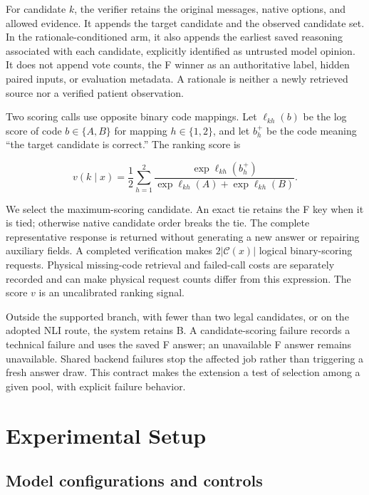 \documentclass[
  english,
  11pt,
]{article}
\begin{document}
For candidate \(k\), the verifier retains the original messages, native
options, and allowed evidence. It appends the target candidate and the
observed candidate set. In the rationale-conditioned arm, it also
appends the earliest saved reasoning associated with each candidate,
explicitly identified as untrusted model opinion. It does not append
vote counts, the F winner as an authoritative label, hidden paired
inputs, or evaluation metadata. A rationale is neither a newly retrieved
source nor a verified patient observation.

Two scoring calls use opposite binary code mappings. Let
\(\ell_{kh}(b)\) be the log score of code \(b\in\{A,B\}\) for mapping
\(h\in\{1,2\}\), and let \(b_h^+\) be the code meaning ``the target
candidate is correct.'' The ranking score is

\[
v(k\mid x)=\frac{1}{2}\sum_{h=1}^{2}
\frac{\exp\ell_{kh}(b_h^+)}
{\exp\ell_{kh}(A)+\exp\ell_{kh}(B)}.
\]

We select the maximum-scoring candidate. An exact tie retains the F key
when it is tied; otherwise native candidate order breaks the tie. The
complete representative response is returned without generating a new
answer or repairing auxiliary fields. A completed verification makes
\(2|\mathcal{C}(x)|\) logical binary-scoring requests. Physical
missing-code retrieval and failed-call costs are separately recorded and
can make physical request counts differ from this expression. The score
\(v\) is an uncalibrated ranking signal.

Outside the supported branch, with fewer than two legal candidates, or
on the adopted NLI route, the system retains B. A candidate-scoring
failure records a technical failure and uses the saved F answer; an
unavailable F answer remains unavailable. Shared backend failures stop
the affected job rather than triggering a fresh answer draw. This
contract makes the extension a test of selection among a given pool,
with explicit failure behavior.

\section{Experimental Setup}\label{experimental-setup}

\subsection{Model configurations and
controls}\label{model-configurations-and-controls}
\end{document}
